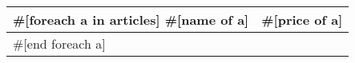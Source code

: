 \documentclass{article}
\begin{document}
\begin{center}
\begin{tabular}{ l r }
\hline
#[foreach a in articles]
#[name of a] & #[price of a] \\ \hline
#[end foreach a]
\hline
\end{tabular}
\end{center}
\end{document}
